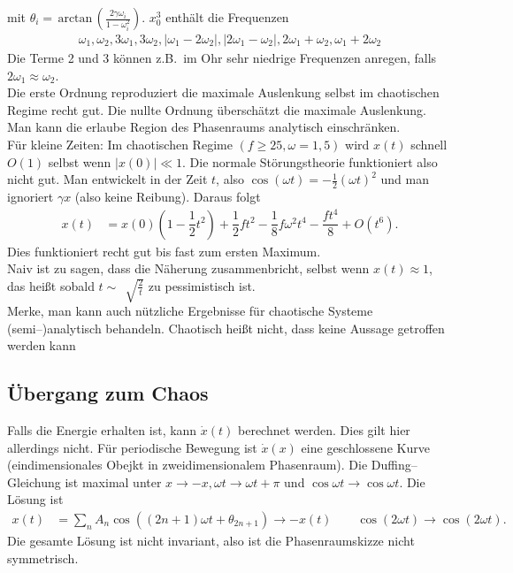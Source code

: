 \documentclass[a4paper,12pt]{article}
\numberwithin{equation}{section}
\begin{document}
mit $\theta _i=\,\text{arctan}\,\left(\tfrac{2\gamma \omega _i}{1-\omega _i^2}\right)$. $x_0^3$ enthält die Frequenzen 
\begin{align*} 
        \omega _1,\omega _2,3\omega _1,3\omega _2,|\omega _1-2\omega _2|,|2\omega _1-\omega _2|,2\omega _1+\omega _2,\omega _1+2\omega _2
\end{align*} 
Die Terme 2 und 3 können z.B.\ im Ohr sehr niedrige Frequenzen anregen, falls $2\omega _1\approx \omega _2$.\\\indent
Die erste Ordnung reproduziert die maximale Auslenkung selbst im chaotischen Regime recht gut. Die nullte Ordnung überschätzt die maximale Auslenkung. Man kann die erlaube Region des Phasenraums \glqq analytisch\grqq{} einschränken.\\\indent
Für kleine Zeiten: Im chaotischen Regime $\left(f\geq 25,\omega =1,5\right)$ wird $x\left(t\right)$ schnell $O\left(1\right)$ selbst wenn $|x\left(0\right)|\ll 1$. Die normale Störungstheorie funktioniert also nicht gut. Man entwickelt in der Zeit $t$, also $\cos \left(\omega t\right)=-\tfrac{1}{2}\left(\omega t\right)^2$ und man ignoriert $\gamma x$ (also keine Reibung). Daraus folgt
\begin{align} 
        x\left(t\right)&=x\left(0\right)\left(1-\dfrac{1}{2}t^2\right)+\dfrac{1}{2}ft^2-\dfrac{1}{8}f\omega ^2t^4-\dfrac{ft^4}{8}+O\left(t^6\right)\label{eq:9.56}
.\end{align} 
Dies funktioniert recht gut bis fast zum ersten Maximum.\\\indent
Naiv ist zu sagen, dass die Näherung zusammenbricht, selbst wenn $x\left(t\right)\approx 1$, das heißt sobald $t\sim \,\sqrt[]{\tfrac{2}{t}}$ zu pessimistisch ist.\\\indent
Merke, man kann auch nützliche Ergebnisse für chaotische Systeme (semi--)analytisch behandeln. Chaotisch heißt nicht, dass keine Aussage getroffen werden kann

\subsection{Übergang zum Chaos}
Falls die Energie erhalten ist, kann $\dot{x}\left(t\right)$ berechnet werden. Dies gilt hier allerdings nicht. Für periodische Bewegung ist $\dot{x}\left(x\right)$ eine geschlossene Kurve (eindimensionales Obejkt in zweidimensionalem Phasenraum). Die Duffing--Gleichung ist maximal unter $x\rightarrow -x,\omega t\rightarrow \omega t+\pi $ und $\cos \omega t\rightarrow \cos \omega t$. Die Lösung ist
\begin{align*} 
        x\left(t\right)&=\sum_{n}^{}A_n\cos \left( \left(2n+1\right)\omega t+\theta _{2n+1}\right)\rightarrow -x\left(t\right)\qquad \cos \left(2\omega t\right)\rightarrow \cos \left(2\omega t\right)
.\end{align*} 
Die gesamte Lösung ist nicht invariant, also ist die Phasenraumskizze nicht symmetrisch.

\end{document}
